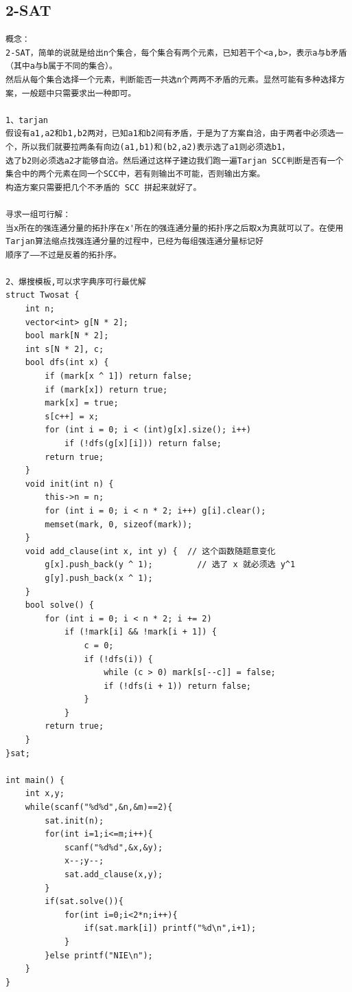 \documentclass[twoside]{article}
\begin{document}
\subsection{2-SAT}
\begin{lstlisting}
概念：
2-SAT，简单的说就是给出n个集合，每个集合有两个元素，已知若干个<a,b>，表示a与b矛盾（其中a与b属于不同的集合）。
然后从每个集合选择一个元素，判断能否一共选n个两两不矛盾的元素。显然可能有多种选择方案，一般题中只需要求出一种即可。

1、tarjan
假设有a1,a2和b1,b2两对，已知a1和b2间有矛盾，于是为了方案自洽，由于两者中必须选一个，所以我们就要拉两条有向边(a1,b1)和(b2,a2)表示选了a1则必须选b1，
选了b2则必须选a2才能够自洽。然后通过这样子建边我们跑一遍Tarjan SCC判断是否有一个集合中的两个元素在同一个SCC中，若有则输出不可能，否则输出方案。
构造方案只需要把几个不矛盾的 SCC 拼起来就好了。

寻求一组可行解：
当x所在的强连通分量的拓扑序在x'所在的强连通分量的拓扑序之后取x为真就可以了。在使用Tarjan算法缩点找强连通分量的过程中，已经为每组强连通分量标记好
顺序了——不过是反着的拓扑序。

2、爆搜模板,可以求字典序可行最优解
struct Twosat {
    int n;
    vector<int> g[N * 2];
    bool mark[N * 2];
    int s[N * 2], c;
    bool dfs(int x) {
        if (mark[x ^ 1]) return false;
        if (mark[x]) return true;
        mark[x] = true;
        s[c++] = x;
        for (int i = 0; i < (int)g[x].size(); i++)
            if (!dfs(g[x][i])) return false;
        return true;
    }
    void init(int n) {
        this->n = n;
        for (int i = 0; i < n * 2; i++) g[i].clear();
        memset(mark, 0, sizeof(mark));
    }
    void add_clause(int x, int y) {  // 这个函数随题意变化
        g[x].push_back(y ^ 1);         // 选了 x 就必须选 y^1
        g[y].push_back(x ^ 1);
    }
    bool solve() {
        for (int i = 0; i < n * 2; i += 2)
            if (!mark[i] && !mark[i + 1]) {
                c = 0;
                if (!dfs(i)) {
                    while (c > 0) mark[s[--c]] = false;
                    if (!dfs(i + 1)) return false;
                }
            }
        return true;
    }
}sat;

int main() {
    int x,y;
    while(scanf("%d%d",&n,&m)==2){
        sat.init(n);
        for(int i=1;i<=m;i++){
            scanf("%d%d",&x,&y);
            x--;y--;
            sat.add_clause(x,y);
        }
        if(sat.solve()){
            for(int i=0;i<2*n;i++){
                if(sat.mark[i]) printf("%d\n",i+1);
            }
        }else printf("NIE\n");
    }
}


\end{lstlisting}
\end{document}
